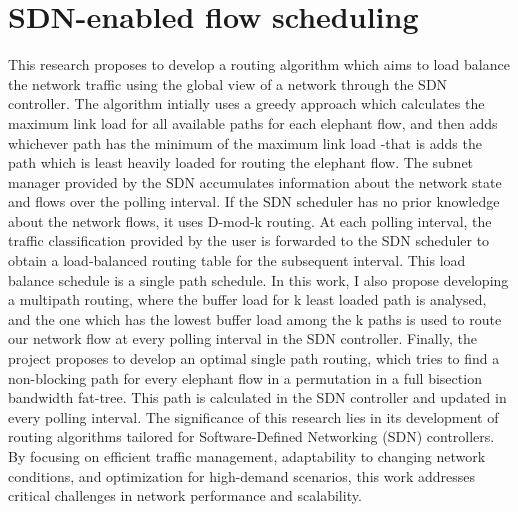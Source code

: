 \section{SDN-enabled flow scheduling}
This research proposes to develop a routing algorithm which aims to load balance the network traffic using the 
global view of a network through the SDN controller.
The algorithm intially uses a greedy approach which calculates the maximum link load for all available
paths for each elephant flow, and then adds whichever path has the minimum of the maximum link load 
-that is adds the path which is least heavily loaded for routing the elephant flow. 
The subnet manager provided by the SDN accumulates information
about the network state and flows over the polling interval. If the SDN
scheduler has no prior knowledge about the network flows, it uses D-mod-k routing.
At each polling interval, the traffic classification provided by the user is forwarded to the SDN scheduler 
to obtain a load-balanced routing table for the subsequent interval. This load balance schedule is a single 
path schedule. In this work, I also propose developing a multipath routing, where the buffer load for k least loaded
path is analysed, and the one which has the lowest buffer load among the k paths is used to route our network flow at every 
polling interval in the SDN controller. Finally,
the project proposes to develop an optimal single path routing, which tries to find a non-blocking path for 
every elephant flow in a permutation in a full bisection bandwidth fat-tree. This path is calculated in the SDN controller and 
updated in every polling interval. The significance of this research lies in its development of routing algorithms tailored for Software-Defined Networking (SDN) controllers. By focusing on efficient traffic management, adaptability to changing network conditions, and optimization for high-demand scenarios, this work addresses critical challenges in network performance and scalability.


